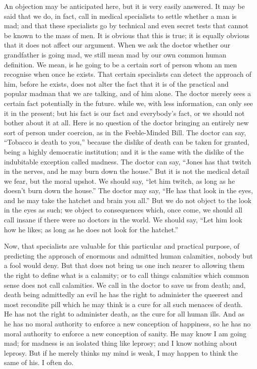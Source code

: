 \documentclass{book}
\begin{document}
An objection may be anticipated here, but it is very easily answered. It may be said that we do, in fact, call in medical specialists to settle whether a man is mad; and that these specialists go by technical and even secret tests that cannot be known to the mass of men. It is obvious that this is true; it is equally obvious that it does not affect our argument. When we ask the doctor whether our grandfather is going mad, we still mean mad by our own common human definition. We mean, is he going to be a certain sort of person whom an men recognise when once he exists. That certain specialists can detect the approach of him, before he exists, does not alter the fact that it is of the practical and popular madman that we are talking, and of him alone. The doctor merely sees a certain fact potentially in the future. while we, with less information, can only see it in the present; but his fact is our fact and everybody’s fact, or we should not bother about it at all. Here is no question of the doctor bringing an entirely new sort of person under coercion, as in the Feeble-Minded Bill. The doctor can say, “Tobacco is death to you,” because the dislike of death can be taken for granted, being a highly democratic institution; and it is the same with the dislike of the indubitable exception called madness. The doctor can say, “Jones has that twitch in the nerves, and he may burn down the house.” But it is not the medical detail we fear, but the moral upshot. We should say, “let him twitch, as long as he doesn’t burn down the house.” The doctor may say, “He has that look in the eyes, and he may take the hatchet and brain you all.” But we do not object to the look in the eyes as such; we object to consequences which, once come, we should all call insane if there were no doctors in the world. We should say, “Let him look how he likes; as long as he does not look for the hatchet.”

Now, that specialists are valuable for this particular and practical purpose, of predicting the approach of enormous and admitted human calamities, nobody but a fool would deny. But that does not bring us one inch nearer to allowing them the right to define what is a calamity; or to call things calamities which common sense does not call calamities. We call in the doctor to save us from death; and, death being admittedly an evil he has the right to administer the queerest and most recondite pill which he may think is a cure for all such menaces of death. He has not the right to administer death, as the cure for all human ills. And as he has no moral authority to enforce a new conception of happiness, so he has no moral authority to enforce a new conception of sanity. He may know I am going mad; for madness is an isolated thing like leprosy; and I know nothing about leprosy. But if he merely thinks my mind is weak, I may happen to think the same of his. I often do.
\end{document}
